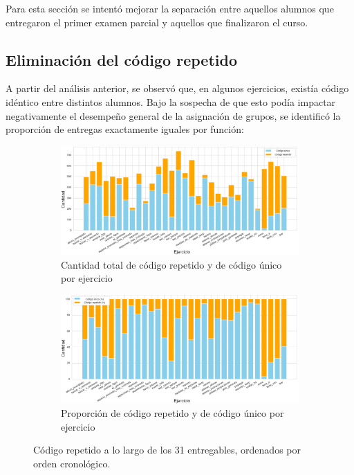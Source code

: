 \documentclass[11pt,a4paper,twoside,openany]{tesis}
\begin{document}
Para esta sección se intentó mejorar la separación entre aquellos alumnos que entregaron el primer examen parcial y aquellos que finalizaron el curso. 

\subsection{Eliminación del código repetido}

A partir del análisis anterior, se observó que, en algunos ejercicios, existía código idéntico entre distintos alumnos. Bajo la sospecha de que esto podía impactar negativamente el desempeño general de la asignación de grupos, se identificó la proporción de entregas exactamente iguales por función:

\begin{figure}[H]
    \centering
    \begin{subfigure}{0.45\textwidth}
        \includegraphics[width=\linewidth]{imagenes/unique-1.png}
        \caption{Cantidad total de código repetido y de código único por ejercicio}
        \label{fig:figura1}
    \end{subfigure}
    \hfill
    \begin{subfigure}{0.45\textwidth}
        \includegraphics[width=\linewidth]{imagenes/unique-2.png}
        \caption{Proporción de código repetido y de código único por ejercicio}
        \label{fig:figura2}
    \end{subfigure}
    \caption{Código repetido a lo largo de los 31 entregables, ordenados por orden cronológico.}
    \label{fig:figuras_juntas}
\end{figure}
\end{document}
